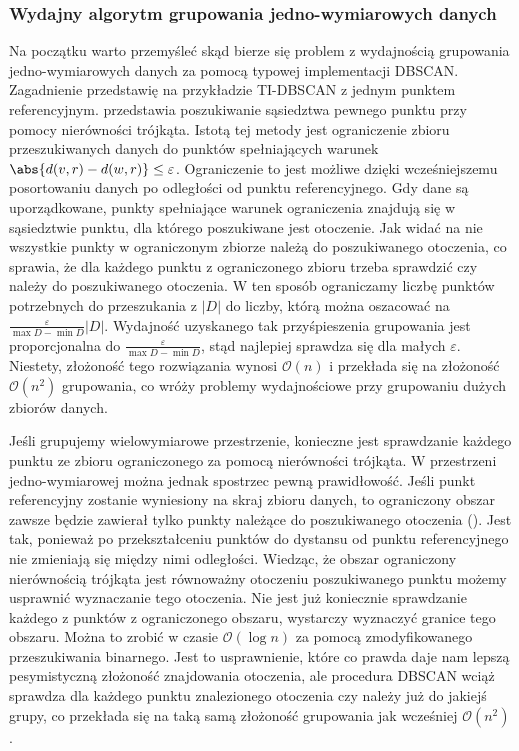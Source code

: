 \subsubsection*{Wydajny algorytm grupowania jedno-wymiarowych danych}
Na początku warto przemyśleć skąd bierze się problem z wydajnością grupowania jedno-wymiarowych danych za pomocą typowej implementacji DBSCAN. Zagadnienie przedstawię na przykładzie TI-DBSCAN z jednym punktem referencyjnym.  przedstawia poszukiwanie sąsiedztwa pewnego punktu przy pomocy nierówności trójkąta. Istotą tej metody jest ograniczenie zbioru przeszukiwanych danych do punktów spełniających warunek $ \abs{d(v, r) - d(w, r)} \le \varepsilon $. Ograniczenie to jest możliwe dzięki wcześniejszemu posortowaniu danych po odległości od punktu referencyjnego. Gdy dane są uporządkowane, punkty spełniające warunek ograniczenia znajdują się w sąsiedztwie punktu, dla którego poszukiwane jest otoczenie. Jak widać na  nie wszystkie punkty w ograniczonym zbiorze należą do poszukiwanego otoczenia, co sprawia, że dla każdego punktu z ograniczonego zbioru trzeba sprawdzić czy należy do poszukiwanego otoczenia. W ten sposób ograniczamy liczbę punktów potrzebnych do przeszukania z $ |D| $ do liczby, którą można oszacować na $ \frac{\varepsilon}{\max{D}-\min{D}}|D| $. Wydajność uzyskanego tak przyśpieszenia grupowania jest proporcjonalna do $ \frac{\varepsilon}{\max{D}-\min{D}} $, stąd najlepiej sprawdza się dla małych $ \varepsilon $. Niestety, złożoność tego rozwiązania wynosi $ \mathcal{O}(n) $ i przekłada się na złożoność $ \mathcal{O}(n^2) $ grupowania, co wróży problemy wydajnościowe przy grupowaniu dużych zbiorów danych.\par



Jeśli grupujemy wielowymiarowe przestrzenie, konieczne jest sprawdzanie każdego punktu ze zbioru ograniczonego za pomocą nierówności trójkąta. W przestrzeni jedno-wymiarowej można jednak spostrzec pewną prawidłowość. Jeśli punkt referencyjny zostanie wyniesiony na skraj zbioru danych, to ograniczony obszar zawsze będzie zawierał tylko punkty należące do poszukiwanego otoczenia (). Jest tak, ponieważ po przekształceniu punktów do dystansu od punktu referencyjnego nie zmieniają się między nimi odległości. Wiedząc, że obszar ograniczony nierównością trójkąta jest równoważny otoczeniu poszukiwanego punktu możemy usprawnić wyznaczanie tego otoczenia. Nie jest już koniecznie sprawdzanie każdego z punktów z ograniczonego obszaru, wystarczy wyznaczyć granice tego obszaru. Można to zrobić w czasie $ \mathcal{O}(\log{}n) $ za pomocą zmodyfikowanego przeszukiwania binarnego\cite{binaryboundarysearch}. Jest to usprawnienie, które co prawda daje nam lepszą pesymistyczną złożoność znajdowania otoczenia, ale procedura DBSCAN wciąż sprawdza dla każdego punktu znalezionego otoczenia czy należy już do jakiejś grupy, co przekłada się na taką samą złożoność grupowania jak wcześniej $ \mathcal{O}(n^2) $.\par

